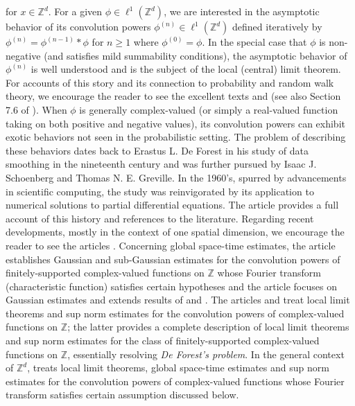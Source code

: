 \documentclass[smallextended]{svjour3}
\theoremstyle{remark}
\begin{document}
for $x\in\mathbb{Z}^d$. For a given $\phi\in\ell^1(\mathbb{Z}^d)$, we are interested in the asymptotic behavior of its convolution powers $\phi^{(n)}\in\ell^1(\mathbb{Z}^d)$ defined iteratively by $\phi^{(n)}=\phi^{(n-1)}\ast\phi$ for $n\geq 1$ where $\phi^{(0)}=\phi$. In the special case that $\phi$ is non-negative (and satisfies mild summability conditions), the asymptotic behavior of $\phi^{(n)}$ is well understood and is the subject of the local (central) limit theorem. For accounts of this story and its connection to probability and random walk theory, we encourage the reader to see the excellent texts \cite{lawler_random_2010} and \cite{spitzer_principles_1964} (see also Section 7.6 of \cite{randles_convolution_2017}). When $\phi$ is generally complex-valued (or simply a real-valued function taking on both positive and negative values), its convolution powers can exhibit exotic behaviors not seen in the probabilistic setting. The problem of describing these behaviors dates back to Erastus L. De Forest in his study of data smoothing in the nineteenth century and was further pursued by Isaac J. Schoenberg and Thomas N. E.  Greville. In the 1960's, spurred by advancements in scientific computing, the study was reinvigorated by its application to numerical solutions to partial differential equations. The article \cite{diaconis_convolution_2014} provides a full account of this history and references to the literature. Regarding recent developments, mostly in the context of one spatial dimension, we encourage the reader to see the articles \cite{diaconis_convolution_2014,randles_convolution_2015, coulombel2020generalized, randles_convolution_2017}. Concerning global space-time estimates, the article \cite{diaconis_convolution_2014} establishes Gaussian and sub-Gaussian estimates for the convolution powers of finitely-supported complex-valued functions on $\mathbb{Z}$ whose Fourier transform (characteristic function) satisfies certain hypotheses and the article \cite{coulombel2020generalized} focuses on Gaussian estimates and extends results of \cite{diaconis_convolution_2014} and \cite{randles_convolution_2017}. The articles \cite{diaconis_convolution_2014} and \cite{randles_convolution_2015} treat local limit theorems and sup norm estimates for the convolution powers of complex-valued functions on $\mathbb{Z}$; the latter provides a complete description of local limit theorems and sup norm estimates for the class of finitely-supported complex-valued functions on $\mathbb{Z}$, essentially resolving \textit{De Forest's problem}. In the general context of $\mathbb{Z}^d$, \cite{randles_convolution_2017} treats local limit theorems, global space-time estimates and sup norm estimates for the convolution powers of complex-valued functions whose Fourier transform satisfies certain assumption discussed below.  \\
\end{document}
